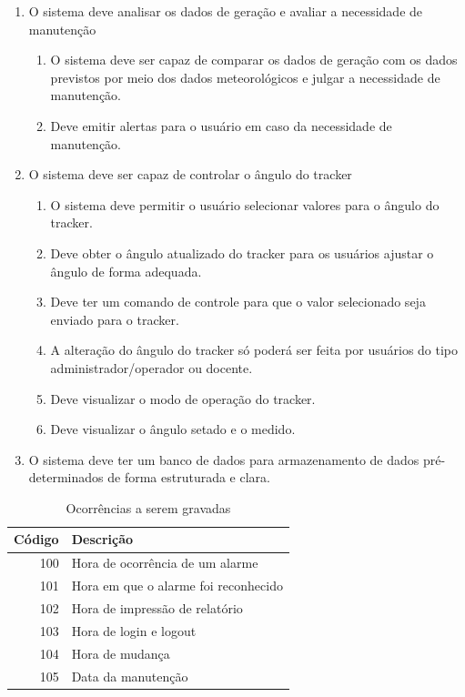 \documentclass[a4paper,12pt]{article}
\begin{document}
\begin{enumerate}
    \item O sistema deve analisar os dados de geração e avaliar a necessidade de manutenção
        \begin{enumerate}
            \item O sistema deve ser capaz de comparar os dados de geração com os dados previstos por meio dos dados meteorológicos e julgar a necessidade de manutenção.
            \item Deve emitir alertas para o usuário em caso da necessidade de manutenção.
        \end{enumerate}
    \item O sistema deve ser capaz de controlar o ângulo do tracker
        \begin{enumerate}
            \item O sistema deve permitir o usuário selecionar valores para o ângulo do tracker.
            \item Deve obter o ângulo atualizado do tracker para os usuários ajustar o ângulo de forma adequada.
            \item Deve ter um comando de controle para que o valor selecionado seja enviado para o tracker.
            \item A alteração do ângulo do tracker só poderá ser feita por usuários do tipo administrador/operador ou docente.
            \item  Deve visualizar o modo de operação do tracker.
            \item  Deve visualizar o ângulo setado e o medido.
        \end{enumerate}
    \item O sistema deve ter um banco de dados para armazenamento de dados pré-determinados de forma estruturada e clara.
\end{enumerate}


 \begin{table}[htbp]
\begin{center}
\begin{tabular}{|r|l|}
\hline
\textbf{Código} & \textbf{Descrição} \\
\hline
100 & Hora de ocorrência de um alarme \\
101 & Hora em que o alarme foi reconhecido \\
102 & Hora de impressão de relatório \\
103 & Hora de login e logout \\
104 & Hora de mudança \\
105 & Data da manutenção \\
\hline
\end{tabular}
\caption{Ocorrências a serem gravadas}
\label{tab:ocorrencias}
\end{center}
\end{table}   
\end{document}

